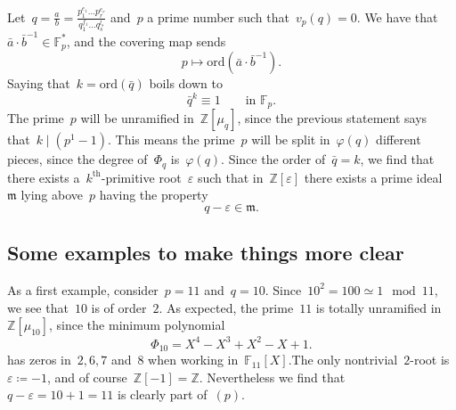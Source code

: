 Let~${q = \frac{a}{b} = \frac{p_1^{e_1}\ldots p_r^{e_r}}{q_1^{f_1}\ldots q_s^{l_s}}}$ and~${p}$ a prime number such that~${v_p(q) = 0}$. We have that~${\bar{a} \cdot \bar{b}^{-1} \in \mathbb{F}_p^*}$, and the covering map sends 
\begin{equation}
  p \mapsto \mathrm{ord}(\bar{a} \cdot \bar{b}^{-1}).
\end{equation}
Saying that~${k = \mathrm{ord}(\bar{q})}$ boils down to 
\begin{equation}
  \bar{q}^k \equiv 1 \qquad \text{in } \mathbb{F}_p.
\end{equation}
The prime~${p}$ will be unramified in~${\mathbb{Z}[\mu_q]}$, since the previous statement says that~${k \mid (p^{1} - 1)}$. This means the prime~${p}$ will be split in~${\varphi(q)}$ different pieces, since the degree of~${\Phi_q}$ is~${\varphi(q)}$. Since the order of~${\bar{q} = k}$, we find that there exists a~${k^{\text{th}}}$-primitive root~${\varepsilon}$ such that in~${\mathbb{Z}[\varepsilon]}$ there exists a prime ideal~${\mathfrak{m}}$ lying above~${p}$ having the property 
\begin{equation}
  q - \varepsilon \in \mathfrak{m}.
\end{equation}

\subsection{Some examples to make things more clear}
\begin{example}
	As a first example, consider~${p = 11}$ and~${q = 10}$. Since~${10^2 = 100 \simeq 1 \mod 11}$, we see that~${10}$ is of order~$2$. As expected, the prime~${11}$ is totally unramified in~${\mathbb{Z}[\mu_{10}]}$, since the minimum polynomial 
  \begin{equation}
    \Phi_{10} = X^4 - X^3 + X^2 - X + 1.
  \end{equation}
  has zeros in~${2,6,7}$ and~${8}$ when working in~${\mathbb{F}_{11}[X]}$.The only nontrivial~${2}$-root is~${\varepsilon\coloneqq-1}$, and of course~${\mathbb{Z}[-1] = \mathbb{Z}}$. Nevertheless we find that~${q - \varepsilon = 10 + 1 = 11}$ is clearly part of~${(p)}$.
\end{example}

